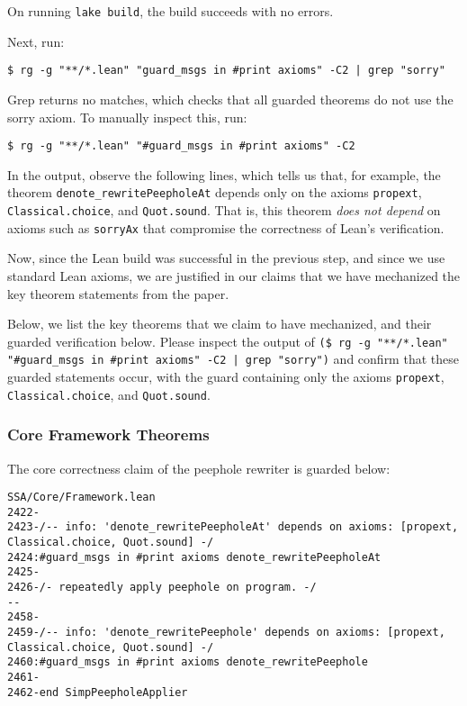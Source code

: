 \documentclass{sigplanconf}
\begin{document}
On running \texttt{lake build}, the build succeeds with no errors.

Next, run:

\begin{verbatim}
$ rg -g "**/*.lean" "guard_msgs in #print axioms" -C2 | grep "sorry"
\end{verbatim}

Grep returns no matches, which checks that all guarded theorems do not use the sorry axiom.
To manually inspect this, run:

\begin{verbatim}
$ rg -g "**/*.lean" "#guard_msgs in #print axioms" -C2
\end{verbatim}

In the output, observe the following lines, which tells us that, for example, the 
theorem \texttt{denote\_rewritePeepholeAt} depends only on the axioms 
\texttt{propext}, \texttt{Classical.choice}, and \texttt{Quot.sound}. That is, this theorem 
\emph{does not depend} on axioms such as \texttt{sorryAx} that compromise the correctness of Lean's verification.

Now, since the Lean build was successful in the previous step, and since we use standard Lean axioms, 
we are justified in our claims that we have mechanized the key theorem statements from the paper.

Below, we list the key theorems that we claim to have mechanized, and their 
guarded verification below. Please inspect the output of 
\texttt{(\$ rg -g "**/*.lean" "\#guard\_msgs in \#print axioms" -C2 | grep "sorry")}
and confirm that these guarded statements occur, with the guard containing only the axioms \texttt{propext},
\texttt{Classical.choice}, and \texttt{Quot.sound}.

\subsubsection{Core Framework Theorems}

The core correctness claim of the peephole rewriter is guarded below:

\begin{verbatim}
SSA/Core/Framework.lean
2422-
2423-/-- info: 'denote_rewritePeepholeAt' depends on axioms: [propext, Classical.choice, Quot.sound] -/
2424:#guard_msgs in #print axioms denote_rewritePeepholeAt
2425-
2426-/- repeatedly apply peephole on program. -/
--
2458-
2459-/-- info: 'denote_rewritePeephole' depends on axioms: [propext, Classical.choice, Quot.sound] -/
2460:#guard_msgs in #print axioms denote_rewritePeephole
2461-
2462-end SimpPeepholeApplier
\end{verbatim}
\end{document}
